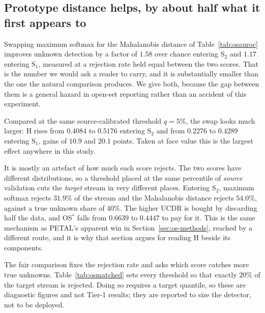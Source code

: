 \subsection{Prototype distance helps, by about half what it first appears to}
\label{sec:os-maha}

Swapping maximum softmax for the Mahalanobis distance of Table~\ref{tab:osauroc} improves
unknown detection by a factor of $1.58$ over chance entering $\text{S}_2$ and $1.17$
entering $\text{S}_1$, measured at a rejection rate held equal between the two scores.
That is the number we would ask a reader to carry, and it is substantially smaller than
the one the natural comparison produces. We give both, because the gap between them is a
general hazard in open-set reporting rather than an accident of this experiment.

Compared at the same source-calibrated threshold $q=5\%$, the swap looks much larger: H
rises from $0.4084$ to $0.5176$ entering $\text{S}_2$ and from $0.2276$ to $0.4289$
entering $\text{S}_1$, gains of $10.9$ and $20.1$ points. Taken at face value this is the
largest effect anywhere in this study.

It is mostly an artefact of how much each score rejects. The two scores have different
distributions, so a threshold placed at the same percentile of \emph{source} validation
cuts the \emph{target} stream in very different places. Entering $\text{S}_2$, maximum
softmax rejects $31.9\%$ of the stream and the Mahalanobis distance rejects $54.0\%$,
against a true unknown share of $40\%$. The higher UCDR is bought by discarding half the
data, and OS$^{*}$ falls from $0.6639$ to $0.4447$ to pay for it. This is the same
mechanism as PETAL's apparent win in Section~\ref{sec:os-methods}, reached by a different
route, and it is why that section argues for reading H beside its components.

The fair comparison fixes the rejection rate and asks which score catches more true
unknowns. Table~\ref{tab:osmatched} sets every threshold so that exactly $20\%$ of the
target stream is rejected. Doing so requires a target quantile, so these are diagnostic
figures and not Tier-1 results; they are reported to size the detector, not to be deployed.

